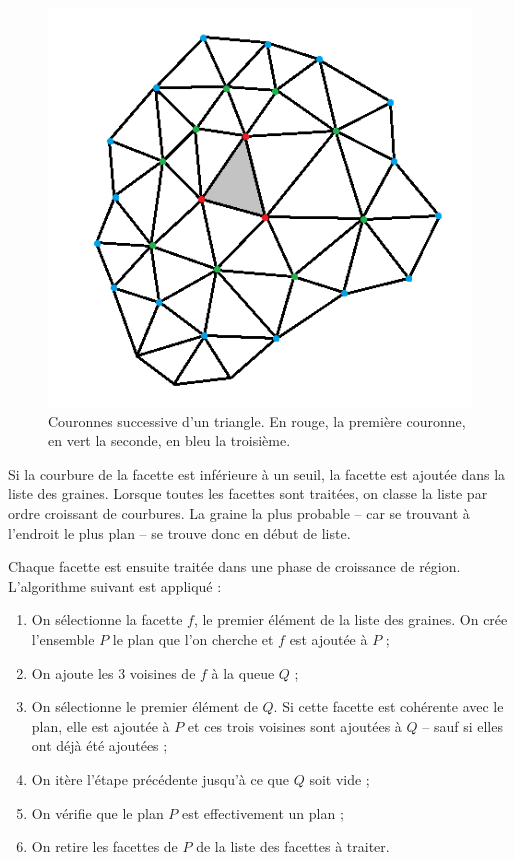 \documentclass[12pt, twoside]{article}
\begin{document}
\begin{figure}[h]
\centering
\includegraphics[scale=0.5]{Couronnes.png}
\caption{\label{fig:couronne} Couronnes successive d'un triangle. En rouge, la première couronne, en vert la seconde, en bleu la troisième.}
\end{figure}

Si la courbure de la facette est inférieure à un seuil, la facette est ajoutée dans la liste des graines. Lorsque toutes les facettes sont traitées, on classe la liste par ordre croissant de courbures. La graine la plus probable -- car se trouvant à l'endroit le plus plan -- se trouve donc en début de liste.

Chaque facette est ensuite traitée dans une phase de croissance de région. L'algorithme suivant est appliqué :
\begin{enumerate}
  \item On sélectionne la facette $f$, le premier élément de la liste des graines. On crée l'ensemble $P$ le plan que l'on cherche et $f$ est ajoutée à $P$ ;
  \item On ajoute les 3 voisines de $f$ à la queue $Q$ ;
  \item On sélectionne le premier élément de $Q$. Si cette facette est cohérente avec le plan, elle est ajoutée à $P$ et ces trois voisines sont ajoutées à $Q$ -- sauf si elles ont déjà été ajoutées ;
  \item On itère l'étape précédente jusqu'à ce que $Q$ soit vide ;
  \item On vérifie que le plan $P$ est effectivement un plan ;
  \item On retire les facettes de $P$ de la liste des facettes à traiter.
\end{enumerate}
\end{document}
